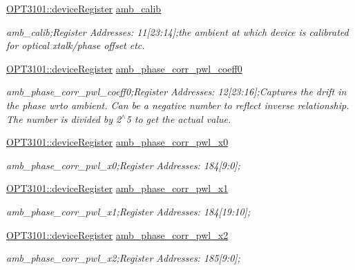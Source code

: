 \begin{DoxyCompactItemize}
\mbox{\hyperlink{class_o_p_t3101_1_1device_register}{O\+P\+T3101\+::device\+Register}} \mbox{\hyperlink{class_o_p_t3101_1_1registers_a445694de6c4a8e73fbcb18d8a0b66292}{amb\+\_\+calib}}
\begin{DoxyCompactList}\small\item\em amb\+\_\+calib;Register Addresses\+: 11\mbox{[}23\+:14\mbox{]};the ambient at which device is calibrated for optical xtalk/phase offset etc. \end{DoxyCompactList}\item 
\mbox{\hyperlink{class_o_p_t3101_1_1device_register}{O\+P\+T3101\+::device\+Register}} \mbox{\hyperlink{class_o_p_t3101_1_1registers_a3a959d073208e7bc1859551052620c33}{amb\+\_\+phase\+\_\+corr\+\_\+pwl\+\_\+coeff0}}
\begin{DoxyCompactList}\small\item\em amb\+\_\+phase\+\_\+corr\+\_\+pwl\+\_\+coeff0;Register Addresses\+: 12\mbox{[}23\+:16\mbox{]};Captures the drift in the phase wrto ambient. Can be a negative number to reflect inverse relationship. The number is divided by 2$^\wedge$5 to get the actual value. \end{DoxyCompactList}\item 
\mbox{\hyperlink{class_o_p_t3101_1_1device_register}{O\+P\+T3101\+::device\+Register}} \mbox{\hyperlink{class_o_p_t3101_1_1registers_a73d0efc733832f3ba5a6dc62af43ef2b}{amb\+\_\+phase\+\_\+corr\+\_\+pwl\+\_\+x0}}
\begin{DoxyCompactList}\small\item\em amb\+\_\+phase\+\_\+corr\+\_\+pwl\+\_\+x0;Register Addresses\+: 184\mbox{[}9\+:0\mbox{]}; \end{DoxyCompactList}\item 
\mbox{\hyperlink{class_o_p_t3101_1_1device_register}{O\+P\+T3101\+::device\+Register}} \mbox{\hyperlink{class_o_p_t3101_1_1registers_a13de3ddef57db197debf1e4b8977503a}{amb\+\_\+phase\+\_\+corr\+\_\+pwl\+\_\+x1}}
\begin{DoxyCompactList}\small\item\em amb\+\_\+phase\+\_\+corr\+\_\+pwl\+\_\+x1;Register Addresses\+: 184\mbox{[}19\+:10\mbox{]}; \end{DoxyCompactList}\item 
\mbox{\hyperlink{class_o_p_t3101_1_1device_register}{O\+P\+T3101\+::device\+Register}} \mbox{\hyperlink{class_o_p_t3101_1_1registers_a6820d23f7f547d0303e4581a9b2b5a78}{amb\+\_\+phase\+\_\+corr\+\_\+pwl\+\_\+x2}}
\begin{DoxyCompactList}\small\item\em amb\+\_\+phase\+\_\+corr\+\_\+pwl\+\_\+x2;Register Addresses\+: 185\mbox{[}9\+:0\mbox{]}; \end{DoxyCompactList}\item 

\end{DoxyCompactItemize}
